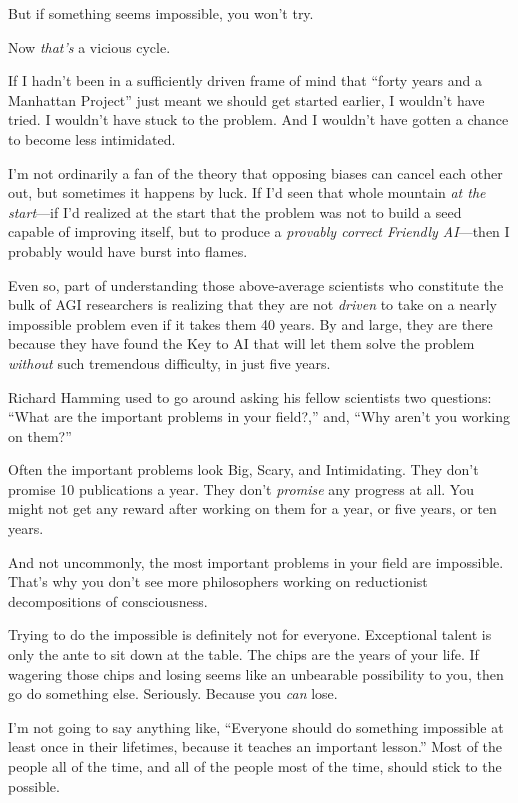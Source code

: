 {
 But if something seems impossible, you won't try.}

{
 Now \textit{that's} a vicious cycle.}

{
 If I hadn't been in a sufficiently driven frame of
mind that ``forty years and a Manhattan
Project'' just meant we should get started earlier, I
wouldn't have tried. I wouldn't have
stuck to the problem. And I wouldn't have gotten a
chance to become less intimidated.}

{
 I'm not ordinarily a fan of the theory that
opposing biases can cancel each other out, but sometimes it happens by
luck. If I'd seen that whole mountain \textit{at the
start}{}---if I'd realized at the start that the
problem was not to build a seed capable of improving itself, but to
produce a \textit{provably correct Friendly AI}{}---then I probably
would have burst into flames.}

{
 Even so, part of understanding those above-average scientists who
constitute the bulk of AGI researchers is realizing that they are not
\textit{driven} to take on a nearly impossible problem even if it takes
them 40 years. By and large, they are there because they have found the
Key to AI that will let them solve the problem \textit{without} such
tremendous difficulty, in just five years.}

{
 Richard Hamming used to go around asking his fellow scientists two
questions: ``What are the important problems in your
field?,'' and, ``Why
aren't you working on them?''}

{
 Often the important problems look Big, Scary, and Intimidating.
They don't promise 10 publications a year. They
don't \textit{promise} any progress at all. You might
not get any reward after working on them for a year, or five years, or
ten years.}

{
 And not uncommonly, the most important problems in your field are
impossible. That's why you don't see
more philosophers working on reductionist decompositions of
consciousness.}

{
 Trying to do the impossible is definitely not for everyone.
Exceptional talent is only the ante to sit down at the table. The chips
are the years of your life. If wagering those chips and losing seems
like an unbearable possibility to you, then go do something else.
Seriously. Because you \textit{can} lose.}

{
 I'm not going to say anything like,
``Everyone should do something impossible at least
once in their lifetimes, because it teaches an important
lesson.'' Most of the people all of the time, and all
of the people most of the time, should stick to the possible.}

